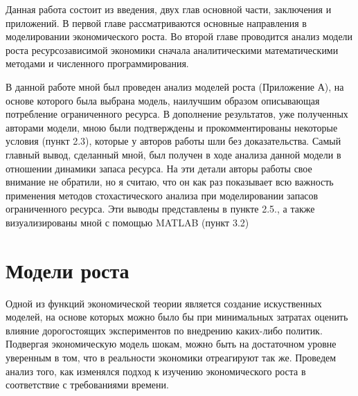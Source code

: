 \documentclass[12pt,a4paper, oneside]{extreport}
\begin{document}
Данная работа состоит из введения, двух глав основной части, заключения и приложений.
В первой  главе рассматриваются основные направления в моделировании экономического роста.
Во второй главе проводится анализ модели роста ресурсозависимой экономики сначала аналитическими математическими методами и численного программирования.

В данной работе мной был проведен анализ моделей роста (Приложение А), на основе которого была выбрана модель, наилучшим образом описывающая потребление ограниченного ресурса. В дополнение результатов, уже полученных авторами модели, мною были подтверждены и прокомментированы некоторые условия (пункт 2.3), которые у авторов работы шли без доказательства.   Самый главный вывод, сделанный мной, был получен в ходе  анализа данной модели  в отношении  динамики  запаса ресурса. На эти детали авторы работы свое внимание не обратили, но я считаю, что он как раз показывает  всю важность применения методов стохастического анализа при моделировании запасов ограниченного ресурса. Эти выводы представлены в пункте 2.5., а также визуализированы мной с помощью MATLAB (пункт 3.2)  






\chapter{Модели роста}


Одной из функций экономической теории является создание искуственных моделей,   на основе которых можно было бы при минимальных затратах оценить влияние дорогостоящих экспериментов по внедрению каких-либо политик.  Подвергая экономическую модель  шокам, можно быть на достаточном уровне  уверенным  в том, что в реальности экономики  отреагируют так же. Проведем анализ того, как изменялся подход к изучению экономического роста в соответствие с требованиями времени.
\end{document}
